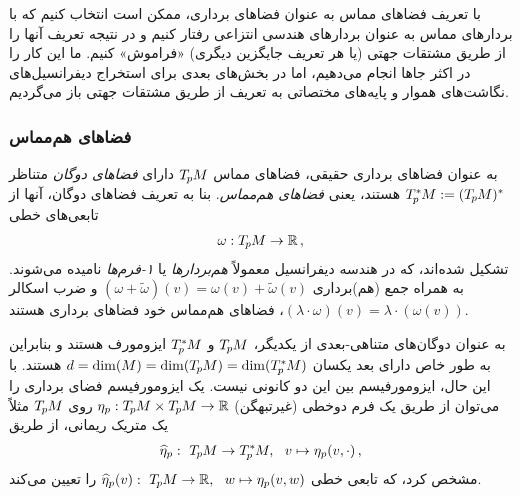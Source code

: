 با تعریف فضاهای مماس به عنوان فضاهای برداری، ممکن است انتخاب کنیم که با بردارهای مماس به عنوان بردارهای هندسی انتزاعی رفتار کنیم و در نتیجه تعریف آنها را از طریق مشتقات جهتی (یا هر تعریف جایگزین دیگری) «فراموش» کنیم.
ما این کار را در اکثر جاها انجام می‌دهیم، اما در بخش‌های بعدی برای استخراج دیفرانسیل‌های نگاشت‌های هموار و پایه‌های مختصاتی به تعریف از طریق مشتقات جهتی باز می‌گردیم.



\subsubsection{فضاهای هم‌مماس}
\label{apx:cotangent_spaces}
به عنوان فضاهای برداری حقیقی، فضاهای مماس $T_{\mkern-1.5mu p}\mkern-.5muM$ دارای \emph{فضاهای دوگان} متناظر $T_{\mkern-1.5mu p}^{\mkern-0mu *}\mkern-1muM := (T_{\mkern-1.5mu p}\mkern-.5muM)^*$ هستند، یعنی \emph{فضاهای هم‌مماس}.
بنا به تعریف فضاهای دوگان، آنها از تابعی‌های خطی
\begin{align}
	\omega: T_{\mkern-1.5mu p}\mkern-.5muM \to \mathbb{R} \,,
\end{align}
تشکیل شده‌اند، که در هندسه دیفرانسیل معمولاً \emph{هم‌بردارها} یا \emph{۱-فرم‌ها} نامیده می‌شوند.
به همراه جمع (هم)برداری
$(\omega + \widetilde{\omega})(v) = \omega(v) + \widetilde{\omega}(v)$
و ضرب اسکالر
$(\lambda \cdot \omega)(v) = \lambda\cdot (\omega(v))$،
فضاهای هم‌مماس خود فضاهای برداری هستند.

به عنوان دوگان‌های متناهی-بعدی از یکدیگر، $T_{\mkern-1.5mu p}\mkern-.5muM$ و $T_{\mkern-1.5mu p}^{\mkern-0mu *}\mkern-1muM$ ایزومورف هستند و بنابراین به طور خاص دارای بعد یکسان $d = \dim(M) = \dim(T_{\mkern-1.5mu p}\mkern-.5muM) = \dim(T_{\mkern-1.5mu p}^{\mkern-0mu *}\mkern-1muM)$ هستند.
با این حال، ایزومورفیسم بین این دو کانونی نیست.
یک ایزومورفیسم فضای برداری را می‌توان از طریق یک فرم دوخطی (غیرتبهگن) $\eta_p: T_{\mkern-1.5mu p}\mkern-.5muM \times T_{\mkern-1.5mu p}\mkern-.5muM \to \mathbb{R}$ روی $T_{\mkern-1.5mu p}\mkern-.5muM$ مثلاً یک متریک ریمانی، از طریق
\begin{align}
	\widehat{\eta}_p:\ T_{\mkern-1.5mu p}\mkern-.5muM \to T_{\mkern-1.5mu p}^{\mkern-0mu *}\mkern-1muM,\ \ v \mapsto \eta_p(v, \cdot) \,,
\end{align}
مشخص کرد، که تابعی خطی
$\widehat{\eta}_p(v):\ T_{\mkern-1.5mu p}\mkern-.5muM \to \mathbb{R},\ \ w \mapsto \eta_p(v, w)$ را تعیین می‌کند.



